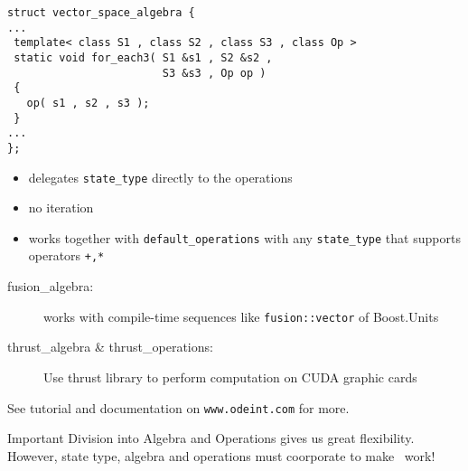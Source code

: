 \begin{frame}[fragile]

\begin{lstlisting}
struct vector_space_algebra {
...
 template< class S1 , class S2 , class S3 , class Op >
 static void for_each3( S1 &s1 , S2 &s2 , 
                        S3 &s3 , Op op )
 {
   op( s1 , s2 , s3 );
 }
...
};
\end{lstlisting}

\begin{itemize}
 \item delegates \lstinline+state_type+ directly to the operations 
 \item no iteration
 \item works together with \lstinline+default_operations+ with any \lstinline+state_type+ that supports operators \lstinline!+,*!
\end{itemize}

\end{frame}


\begin{frame}[fragile]

\begin{description}
 \item[fusion\_algebra:] works with compile-time sequences like \lstinline+fusion::vector+ of Boost.Units
 \item[thrust\_algebra \& thrust\_operations:] Use thrust library to perform computation on CUDA graphic cards
\end{description}

See tutorial and documentation on \verb+www.odeint.com+ for more.

\pause
\vspace{0.5em}
\begin{block}{Important}
 Division into Algebra and Operations gives us great flexibility. However, state type, algebra and operations must coorporate to make \odeint\ work!
\end{block}

\end{frame}

